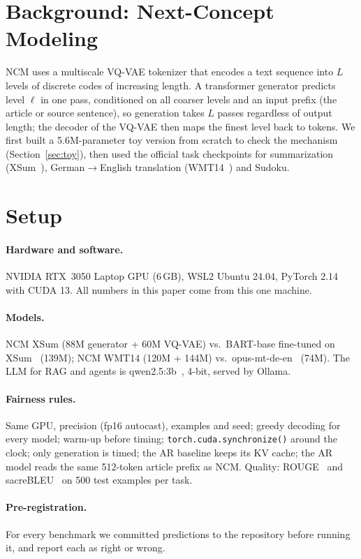 \documentclass[11pt]{article}
\begin{document}
\section{Background: Next-Concept Modeling}
NCM uses a multiscale VQ-VAE tokenizer that encodes a text sequence into $L$ levels of
discrete codes of increasing length. A transformer generator predicts level $\ell$ in one
pass, conditioned on all coarser levels and an input prefix (the article or source
sentence), so generation takes $L$ passes regardless of output length; the decoder of the
VQ-VAE then maps the finest level back to tokens. We first built a 5.6M-parameter toy
version from scratch to check the mechanism (Section~\ref{sec:toy}), then used the official
task checkpoints for summarization (XSum~\citep{xsum2018}), German$\to$English translation
(WMT14~\citep{wmt2014}) and Sudoku.

\section{Setup}
\paragraph{Hardware and software.} NVIDIA RTX~3050 Laptop GPU (6\,GB), WSL2 Ubuntu 24.04,
PyTorch 2.14 with CUDA 13. All numbers in this paper come from this one machine.

\paragraph{Models.} NCM XSum (88M generator + 60M VQ-VAE) vs.\ BART-base fine-tuned on
XSum~\citep{bart2020} (139M); NCM WMT14 (120M + 144M) vs.\ opus-mt-de-en~\citep{opusmt2020,marian2018}
(74M). The LLM for RAG and agents is qwen2.5:3b~\citep{qwen25}, 4-bit, served by Ollama.

\paragraph{Fairness rules.} Same GPU, precision (fp16 autocast), examples and seed; greedy
decoding for every model; warm-up before timing; \texttt{torch.cuda.synchronize()} around
the clock; only generation is timed; the AR baseline keeps its KV cache; the AR model reads
the same 512-token article prefix as NCM. Quality: ROUGE~\citep{rouge2004} and
sacreBLEU~\citep{bleu2002,sacrebleu2018} on 500 test examples per task.

\paragraph{Pre-registration.} For every benchmark we committed predictions to the repository
before running it, and report each as right or wrong.
\end{document}
